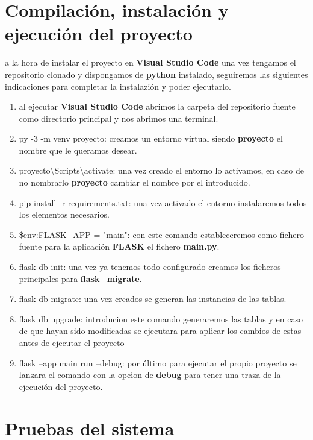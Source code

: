 \section{Compilación, instalación y ejecución del proyecto}
a la hora de instalar el proyecto en \textbf{Visual Studio Code} una vez tengamos el repositorio clonado y dispongamos de \textbf{python} instalado, seguiremos las siguientes indicaciones para completar la instalazión y poder ejecutarlo.
\begin{enumerate}
    \item al ejecutar \textbf{Visual Studio Code} abrimos la carpeta del repositorio fuente como directorio principal y nos abrimos una terminal. 
    \item py -3 -m venv proyecto: creamos un entorno virtual siendo \textbf{proyecto} el nombre que le queramos desear.
    \item proyecto\textbackslash Scripts\textbackslash activate: una vez creado el entorno lo activamos, en caso de no nombrarlo \textbf{proyecto} cambiar el nombre por el introducido.
    \item pip install -r requirements.txt: una vez activado el entorno instalaremos todos los elementos necesarios.
    \item \$env:FLASK\_APP = "main": con este comando estableceremos como fichero fuente para la aplicación \textbf{FLASK} el fichero \textbf{main.py}. 
    \item flask db init: una vez ya tenemos todo configurado creamos los ficheros principales para \textbf{flask\_migrate}.
    \item flask db migrate: una vez creados se generan las instancias de las tablas.
    \item flask db upgrade: introducion este comando generaremos las tablas y en caso de que hayan sido modificadas se ejecutara para aplicar los cambios de estas antes de ejecutar el proyecto
    \item flask --app main run --debug: por último para ejecutar el propio proyecto se lanzara el comando con la opcion de \textbf{debug} para tener una traza de la ejecución del proyecto.
\end{enumerate}
\section{Pruebas del sistema}
